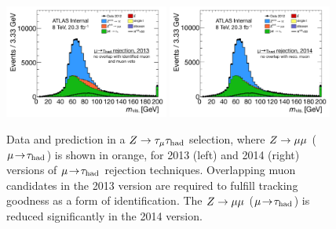 \begin{figure}[tp]
  \centering
  \includegraphics[width=0.48\textwidth]{figures/tauperformance/muonrejection_2013}
  \includegraphics[width=0.48\textwidth]{figures/tauperformance/muonrejection_2014}
  \caption{Data and prediction in a $Z\rightarrow\tau_\mu \tau_\text{had}$ selection, where $Z \rightarrow \mu\mu$ ($\mu\!\rightarrow\!\tau_\text{had}$) is shown in orange, for 2013 (left) and 2014 (right) versions of $\mu\!\rightarrow\!\tau_\text{had}$ rejection techniques. Overlapping muon candidates in the 2013 version are required to fulfill tracking goodness as a form of identification. The $Z \rightarrow \mu\mu$ ($\mu\!\rightarrow\!\tau_\text{had}$) is reduced significantly in the 2014 version.}
  \label{fig:taus-muonfakes3}
\end{figure}



